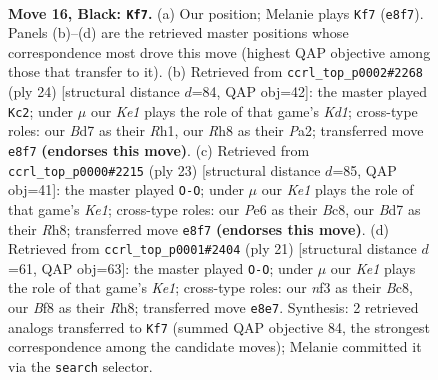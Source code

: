 \documentclass[11pt]{article}
\begin{document}
\clearpage

\begin{figure}[p]\centering
\begin{subfigure}{0.46\textwidth}\centering
\resizebox{\linewidth}{!}{%
\newchessgame
\chessboard[
  setfen={1r2kb1r/1p1b2pp/p1n1p3/4Pp2/n7/4BNP1/PPKN1P1P/R4BR1 b k - 1 16},
  showmover=false,
  pgfstyle=straightmove, color=movearrow, markmove={e8-f7}
]}
\caption{}
\end{subfigure}\hfill
\begin{subfigure}{0.46\textwidth}\centering
\resizebox{\linewidth}{!}{%
\newchessgame
\chessboard[
  setfen={r1b2rk1/pp2bppp/n4n2/1N2N3/4p3/2P5/PP2BPPP/R1BK3R w - - 2 13},
  showmover=false,
  pgfstyle=straightmove, color=movearrow, markmove={d1-c2}
]}
\caption{}
\end{subfigure}
\\[4pt]
\begin{subfigure}{0.46\textwidth}\centering
\resizebox{\linewidth}{!}{%
\newchessgame
\chessboard[
  setfen={r1b1k2r/1p1n1pp1/p3p2p/2bn4/P1N5/2P2N2/1P1B1PPP/R3KB1R b KQkq - 1 12},
  showmover=false,
  pgfstyle=straightmove, color=movearrow, markmove={e8-g8}
]}
\caption{}
\end{subfigure}\hfill
\begin{subfigure}{0.46\textwidth}\centering
\resizebox{\linewidth}{!}{%
\newchessgame
\chessboard[
  setfen={r1b1k2r/1p2bppp/p1n1pn2/8/1PB5/P3PN2/3N1PPP/R1BR2K1 b kq - 2 11},
  showmover=false,
  pgfstyle=straightmove, color=movearrow, markmove={e8-g8}
]}
\caption{}
\end{subfigure}
\caption{\textbf{Move 16, Black: \texttt{Kf7}.} (a) Our position; Melanie plays \texttt{Kf7} (\texttt{e8f7}). Panels (b)--(d) are the retrieved master positions whose correspondence most drove this move (highest QAP objective among those that transfer to it). (b) Retrieved from \texttt{ccrl\_top\_p0002\#2268} (ply 24) [structural distance $d$=84, QAP obj=42]: the master played \texttt{Kc2}; under $\mu$ our \emph{Ke1} plays the role of that game's \emph{Kd1}; cross-type roles: our \emph{B}d7 as their \emph{R}h1, our \emph{R}h8 as their \emph{P}a2; transferred move \texttt{e8f7} \textbf{(endorses this move)}. (c) Retrieved from \texttt{ccrl\_top\_p0000\#2215} (ply 23) [structural distance $d$=85, QAP obj=41]: the master played \texttt{O-O}; under $\mu$ our \emph{Ke1} plays the role of that game's \emph{Ke1}; cross-type roles: our \emph{P}e6 as their \emph{B}c8, our \emph{B}d7 as their \emph{R}h8; transferred move \texttt{e8f7} \textbf{(endorses this move)}. (d) Retrieved from \texttt{ccrl\_top\_p0001\#2404} (ply 21) [structural distance $d$=61, QAP obj=63]: the master played \texttt{O-O}; under $\mu$ our \emph{Ke1} plays the role of that game's \emph{Ke1}; cross-type roles: our \emph{n}f3 as their \emph{B}c8, our \emph{B}f8 as their \emph{R}h8; transferred move \texttt{e8e7}. Synthesis: 2 retrieved analogs transferred to \texttt{Kf7} (summed QAP objective 84, the strongest correspondence among the candidate moves); Melanie committed it via the \texttt{search} selector.}
\label{fig:thought-m31}
\end{figure}
\end{document}
